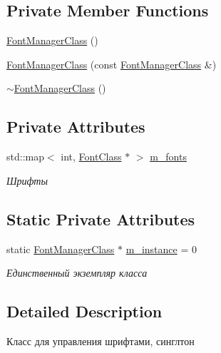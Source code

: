 \subsection*{Private Member Functions}
\begin{DoxyCompactItemize}
\item 
\hyperlink{class_font_manager_class_aaeb53dd133e4c945c649670104226769}{Font\+Manager\+Class} ()
\item 
\hyperlink{class_font_manager_class_ac103aeb5ff1907d9e8aa7ad1cb985236}{Font\+Manager\+Class} (const \hyperlink{class_font_manager_class}{Font\+Manager\+Class} \&)
\item 
\hyperlink{class_font_manager_class_aed1d249b64ccff4393603dfd1c38dfcb}{$\sim$\+Font\+Manager\+Class} ()
\end{DoxyCompactItemize}
\subsection*{Private Attributes}
\begin{DoxyCompactItemize}
\item 
std\+::map$<$ int, \hyperlink{class_font_class}{Font\+Class} $\ast$ $>$ \hyperlink{class_font_manager_class_a31bf7d784b7a4a7b2093e7f631625c6d}{m\+\_\+fonts}
\begin{DoxyCompactList}\small\item\em Шрифты \end{DoxyCompactList}\end{DoxyCompactItemize}
\subsection*{Static Private Attributes}
\begin{DoxyCompactItemize}
\item 
static \hyperlink{class_font_manager_class}{Font\+Manager\+Class} $\ast$ \hyperlink{class_font_manager_class_a748d4e0d0e41d2284ecffcba2a647223}{m\+\_\+instance} = 0
\begin{DoxyCompactList}\small\item\em Единственный экземпляр класса \end{DoxyCompactList}\end{DoxyCompactItemize}


\subsection{Detailed Description}
Класс для управления шрифтами, синглтон 

